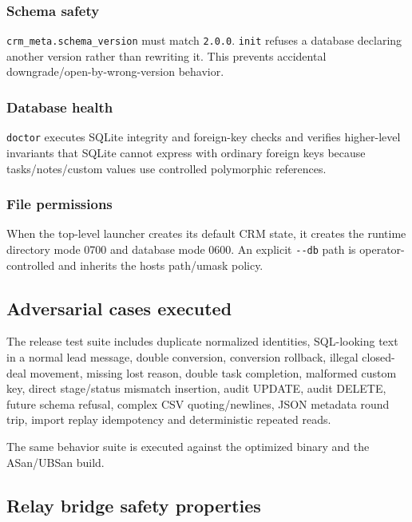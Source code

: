 \documentclass[
]{article}
\begin{document}
\subsubsection{Schema safety}\label{schema-safety}

\texttt{crm\_meta.schema\_version} must match \texttt{2.0.0}.
\texttt{init} refuses a database declaring another version rather than
rewriting it. This prevents accidental downgrade/open-by-wrong-version
behavior.

\subsubsection{Database health}\label{database-health}

\texttt{doctor} executes SQLite integrity and foreign-key checks and
verifies higher-level invariants that SQLite cannot express with
ordinary foreign keys because tasks/notes/custom values use controlled
polymorphic references.

\subsubsection{File permissions}\label{file-permissions}

When the top-level launcher creates its default CRM state, it creates
the runtime directory mode 0700 and database mode 0600. An explicit
\texttt{-\/-db} path is operator-controlled and inherits the
host\textquotesingle s path/umask policy.

\subsection{Adversarial cases
executed}\label{adversarial-cases-executed}

The release test suite includes duplicate normalized identities,
SQL-looking text in a normal lead message, double conversion, conversion
rollback, illegal closed-deal movement, missing lost reason, double task
completion, malformed custom key, direct stage/status mismatch
insertion, audit UPDATE, audit DELETE, future schema refusal, complex
CSV quoting/newlines, JSON metadata round trip, import replay
idempotency and deterministic repeated reads.

The same behavior suite is executed against the optimized binary and the
ASan/UBSan build.

\subsection{Relay bridge safety
properties}\label{relay-bridge-safety-properties}
\end{document}
